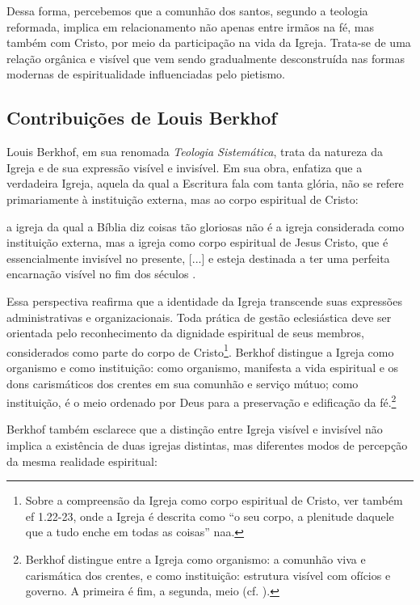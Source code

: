 Dessa forma, percebemos que a comunhão dos santos, segundo a teologia reformada, implica em relacionamento não apenas entre irmãos na fé, mas também com Cristo, por meio da participação na vida da Igreja. Trata-se de uma relação orgânica e visível que vem sendo gradualmente desconstruída nas formas modernas de espiritualidade influenciadas pelo pietismo.

\subsection{Contribuições de Louis Berkhof}

Louis Berkhof, em sua renomada \textit{Teologia Sistemática}, trata da natureza da Igreja e de sua expressão visível e invisível. Em sua obra, enfatiza que a verdadeira Igreja, aquela da qual a Escritura fala com tanta glória, não se refere primariamente à instituição externa, mas ao corpo espiritual de Cristo:

\begin{citacao}
    a igreja da qual a Bíblia diz coisas tão gloriosas não é a igreja considerada como instituição externa, mas a igreja como corpo espiritual de Jesus Cristo, que é essencialmente invisível no presente, [...] e esteja destinada a ter uma perfeita encarnação visível no fim dos séculos \cite[p.~644]{berkhof2012}.
\end{citacao}

Essa perspectiva reafirma que a identidade da Igreja transcende suas expressões administrativas e organizacionais. Toda prática de gestão eclesiástica deve ser orientada pelo reconhecimento da dignidade espiritual de seus membros, considerados como parte do corpo de Cristo\footnote{Sobre a compreensão da Igreja como corpo espiritual de Cristo, ver também \gls{ef} 1.22-23, onde a Igreja é descrita como ``o seu corpo, a plenitude daquele que a tudo enche em todas as coisas'' \gls{naa}.}. Berkhof distingue a Igreja como organismo e como instituição: como organismo, manifesta a vida espiritual e os dons carismáticos dos crentes em sua comunhão e serviço mútuo; como instituição, é o meio ordenado por Deus para a preservação e edificação da fé.\footnote{Berkhof distingue entre a Igreja como organismo: a comunhão viva e carismática dos crentes, e como instituição: estrutura visível com ofícios e governo. A primeira é fim, a segunda, meio (cf. \cite[p.~638]{berkhof2012}).}

Berkhof também esclarece que a distinção entre Igreja visível e invisível não implica a existência de duas igrejas distintas, mas diferentes modos de percepção da mesma realidade espiritual:

